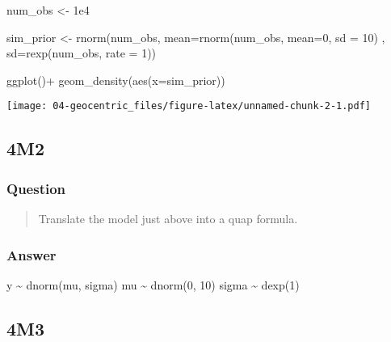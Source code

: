 \documentclass[
]{book}
\newenvironment{Shaded}{\begin{snugshade}}{\end{snugshade}}
\newcommand{\AttributeTok}[1]{\textcolor[rgb]{0.77,0.63,0.00}{#1}}
\newcommand{\DecValTok}[1]{\textcolor[rgb]{0.00,0.00,0.81}{#1}}
\newcommand{\FloatTok}[1]{\textcolor[rgb]{0.00,0.00,0.81}{#1}}
\newcommand{\FunctionTok}[1]{\textcolor[rgb]{0.00,0.00,0.00}{#1}}
\newcommand{\NormalTok}[1]{#1}
\newcommand{\OtherTok}[1]{\textcolor[rgb]{0.56,0.35,0.01}{#1}}
\newcommand{\SpecialCharTok}[1]{\textcolor[rgb]{0.00,0.00,0.00}{#1}}
\begin{document}
\begin{Shaded}
\begin{Highlighting}[]
\NormalTok{num\_obs }\OtherTok{\textless{}{-}} \FloatTok{1e4}

\NormalTok{sim\_prior }\OtherTok{\textless{}{-}} \FunctionTok{rnorm}\NormalTok{(num\_obs,}
                   \AttributeTok{mean=}\FunctionTok{rnorm}\NormalTok{(num\_obs, }\AttributeTok{mean=}\DecValTok{0}\NormalTok{, }\AttributeTok{sd =} \DecValTok{10}\NormalTok{) , }
                   \AttributeTok{sd=}\FunctionTok{rexp}\NormalTok{(num\_obs, }\AttributeTok{rate =} \DecValTok{1}\NormalTok{))}

\FunctionTok{ggplot}\NormalTok{()}\SpecialCharTok{+}
  \FunctionTok{geom\_density}\NormalTok{(}\FunctionTok{aes}\NormalTok{(}\AttributeTok{x=}\NormalTok{sim\_prior))}
\end{Highlighting}
\end{Shaded}

\texttt{[image: 04-geocentric\_files/figure-latex/unnamed-chunk-2-1.pdf]}

\hypertarget{m2-2}{%
\subsection*{4M2}\label{m2-2}}

\hypertarget{question-39}{%
\subsubsection*{Question}\label{question-39}}

\begin{quote}
Translate the model just above into a quap formula.
\end{quote}

\hypertarget{answer-39}{%
\subsubsection*{Answer}\label{answer-39}}

y \textasciitilde{} dnorm(mu, sigma)
mu \textasciitilde{} dnorm(0, 10)
sigma \textasciitilde{} dexp(1)

\hypertarget{m3-2}{%
\subsection*{4M3}\label{m3-2}}
\end{document}
